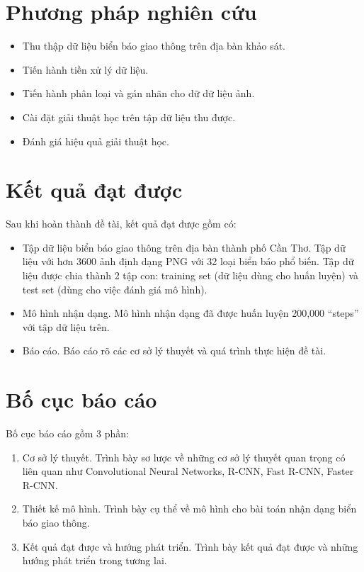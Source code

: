 \documentclass[../thesis.tex]{subfiles}
\begin{document}
\section{Phương pháp nghiên cứu}

\begin{itemize}
  \item Thu thập dữ liệu biển báo giao thông trên địa bàn khảo sát.
  \item Tiến hành tiền xử lý dữ liệu.
  \item Tiến hành phân loại và gán nhãn cho dữ dữ liệu ảnh.
  \item Cài đặt giải thuật học trên tập dữ liệu thu được.
  \item Đánh giá hiệu quả giải thuật học.
\end{itemize}

\section{Kết quả đạt được}

Sau khi hoàn thành đề tài, kết quả đạt được gồm có:

\begin{itemize}
  \item Tập dữ liệu biển báo giao thông trên địa bàn thành phố Cần Thơ. Tập dữ liệu với hơn 3600 ảnh định dạng PNG với 32 loại biển báo phổ biến. Tập dữ liệu được chia thành 2 tập con: training set (dữ liệu dùng cho huấn luyện) và test set (dùng cho việc đánh giá mô hình).
  \item Mô hình nhận dạng. Mô hình nhận dạng đã được huấn luyện 200,000 ``steps'' với tập dữ liệu trên.
  \item Báo cáo. Báo cáo rõ các cơ sở lý thuyết và quá trình thực hiện đề tài.
\end{itemize}

\section{Bố cục báo cáo}

Bố cục báo cáo gồm 3 phần:

\begin{enumerate}
  \item Cơ sở lý thuyết. Trình bày sơ lược về những cơ sở lý thuyết quan trọng có liên quan như Convolutional Neural Networks, R-CNN, Fast R-CNN, Faster R-CNN.
  \item Thiết kế mô hình. Trình bày cụ thể về mô hình cho bài toán nhận dạng biển báo giao thông.
  \item Kết quả đạt được và hướng phát triển. Trình bày kết quả đạt được và những hướng phát triển trong tương lai.
\end{enumerate}
\end{document}
